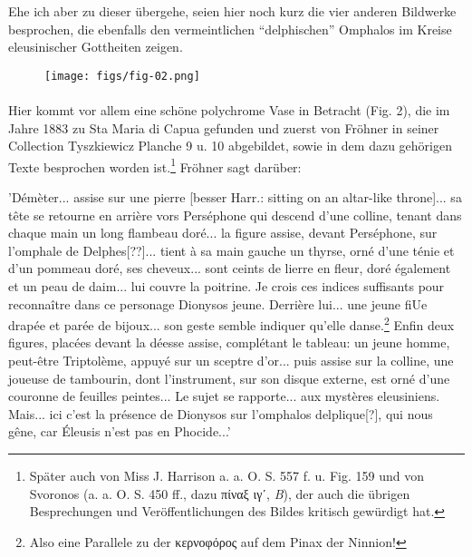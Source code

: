 \documentclass[a4paper, 11pt, oneside]{article}
\begin{document}
Ehe ich aber zu dieser übergehe, seien hier noch kurz die vier anderen Bildwerke besprochen, die ebenfalls den vermeintlichen "`delphischen"' Omphalos im Kreise eleusinischer Gottheiten zeigen.

\begin{figure}[H]
\centering
\texttt{[image: figs/fig-02.png]}
\caption{}
\end{figure}
\paragraph{}
Hier kommt vor allem eine schöne polychrome Vase in Betracht (Fig. 2), die im Jahre 1883 zu Sta Maria di Capua gefunden und zuerst von Fröhner in seiner Collection Tyszkiewicz Planche 9 u. 10 abgebildet, sowie in dem dazu gehörigen Texte besprochen worden ist.\footnote{Später auch von Miss J. Harrison a. a. O. S. 557 f. u. Fig. 159 und von Svoronos (a. a. O. S. 450 ff., dazu πίναξ ιγʹ, \emph{B}), der auch die übrigen Besprechungen und Veröffentlichungen des Bildes kritisch gewürdigt hat.} Fröhner sagt darüber:

'Démèter... assise sur une pierre [besser Harr.: sitting on an altar-like throne]... sa tête se retourne en arrière vors Perséphone qui descend d'une colline, tenant dans chaque main un long flambeau doré... la figure assise, devant Perséphone, sur l'omphale de Delphes[??]... tient à sa main gauche un thyrse, orné d'une ténie et d'un pommeau doré, ses cheveux... sont ceints de lierre en fleur, doré également et un peau de daim... lui couvre la poitrine. Je crois ces indices suffisants pour reconnaître dans ce personage Dionysos jeune. Derrière lui... une jeune fiUe drapée et parée de bijoux... son geste semble indiquer qu'elle danse.\footnote{Also eine Parallele zu der κερνοφόρος auf dem Pinax der Ninnion!} Enfin deux figures, placées devant la déesse assise, complétant le tableau: un jeune homme, peut-être Triptolème, appuyé sur un sceptre d'or... puis assise sur la colline, une joueuse de tambourin, dont l'instrument, sur son disque externe, est orné d'une couronne de feuilles peintes... Le sujet se rapporte... aux mystères eleusiniens. Mais... ici c'est la présence de Dionysos sur l'omphalos delplique[?], qui nous gêne, car Éleusis n'est pas en Phocide...'
\end{document}
